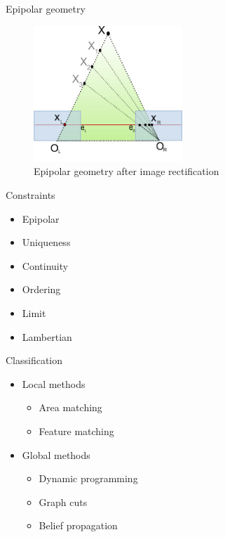 \documentclass[10pt]{beamer}
\begin{document}
\begin{frame}[fragile]{Epipolar geometry}
  \begin{figure}[h!]
    \centering
    \includegraphics[width=0.5\textwidth]{../paper/src/images/epipolar-rectified.png}
    \caption[Epipolar geometry after image rectification]{Epipolar geometry after image rectification\protect\footnotemark}
  \end{figure}
\end{frame}

\begin{frame}[fragile]{Constraints}
  \begin{itemize}
    \item Epipolar
    \item Uniqueness
    \item Continuity
    \item Ordering
    \item Limit
    \item Lambertian
  \end{itemize}
\end{frame}

\begin{frame}[fragile]{Classification}
  \begin{itemize}
    \item Local methods
    \begin{itemize}
      \item Area matching
      \item Feature matching
    \end{itemize}
    \item Global methods
    \begin{itemize}
      \item Dynamic programming
      \item Graph cuts
      \item Belief propagation
    \end{itemize}
  \end{itemize}
\end{frame}
\end{document}
